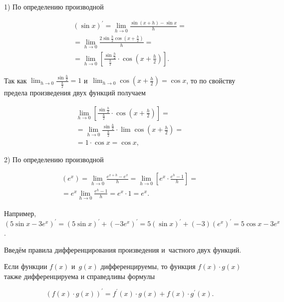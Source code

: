 1) По определению  производной

\begin{multline*}
\displaystyle (\sin x)^\prime = \lim_{h \to 0} \frac{\sin (x+h) - \sin x}{h} = \\
= \lim_{h \to 0} \frac{2\sin\frac{h}{2} \cos \left( x + \frac{h}{2} \right)}{h} = \\
= \lim_{h \to 0}
\left[
    \frac{\sin \frac{h}{2}}{\frac{h}{2}} \cdot
    \cos \left( x + \frac{h}{2} \right) 
\right].
\end{multline*}

\noindent
Так как $\displaystyle \lim_{h \to 0} \frac{\sin \frac{h}{2}}{\frac{h}{2}} = 1$
и~$\displaystyle \lim_{h \to 0} \cos \left( x + \frac{h}{2} \right) = \cos x$,
то по свойству предела произведения двух функций получаем

\begin{multline*}
\displaystyle \lim_{h \to 0} 
\left[
\frac{\sin \frac{h}{2}}{\frac{h}{2}} \cdot \cos \left( x + \frac{h}{2} \right) 
\right] = \\
= \lim_{h \to 0}
    \frac{\sin \frac{h}{2}}{\frac{h}{2}} \cdot \lim \cos \left( x + \frac{h}{2} \right) = \\
= 1 \cdot \cos x = \cos x,
\end{multline*}

2) По определению производной

\begin{multline*}
\displaystyle \left( e^{x} \right) = \lim_{h \to 0} \frac{e^{x+h} - e^{x}}{h} = 
\lim_{h \to 0} \left[ e^{x} \cdot \frac{e^{h} - 1}{h} \right] = \\
= e^{x} \lim_{h \to 0} \frac{e^{h} - 1}{h} = e^{x}  \cdot 1 = e^{x}.
\end{multline*}

Например, $\left( 5 \sin x - 3 e^{x} \right)^\prime =
(5 \sin x)^\prime + (-3e^{x})^\prime =
5(\sin x)^\prime + (-3)(e^{x})^\prime = 5 \cos x -3 e^{x}$.

Введём правила дифференцирования произведения и~частного двух функций.

\begin{Th}\label{th:5_1_1}
Если функции $f(x)$ и~$g(x)$ дифференцируемы, то функция $f(x) \cdot g(x)$
также дифференцируема и справедливы формулы

\begin{equation}\label{eq:5_1_1}
\left( f(x) \cdot g(x) \right)^\prime = 
f^\prime(x) \cdot g(x) + f(x) \cdot g^\prime(x).
\end{equation}
\end{Th}


